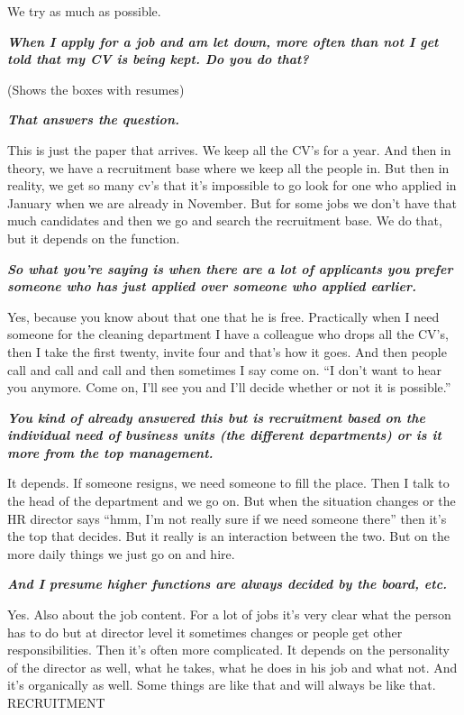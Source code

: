 \documentclass[a4paper,fleqn,11pt,dvips,titlepage]{article}
\newcommand{\question}[1]{\textbf{\textit{#1}}}
\numberwithin{figure}{section}
\numberwithin{equation}{section}
\begin{document}
 We try as much as possible. 

\question{ When I apply for a job and am let down, more often than not I get told that my CV is being kept. Do you do that?}

(Shows the boxes with resumes) 

\question{That answers the question.}

This is just the paper that arrives. We keep all the CV’s for a year. And then in theory, we have a recruitment base where we keep all the people in. But then in reality, we get so many cv’s that it’s impossible to go look for one who applied in January when we are already in November. But for some jobs we don’t have that much candidates and then we go and search the recruitment base. We do that, but it depends on the function. 

\question{So what you’re saying is when there are a lot of applicants you prefer someone who has just applied over someone who applied earlier.}

Yes, because you know about that one that he is free. Practically when I need someone for the cleaning department I have a colleague who drops all the CV’s, then I take the first twenty, invite four and that’s how it goes. And then people call and call and call and then sometimes I say come on. “I don’t want to hear you anymore. Come on, I’ll see you and I’ll decide whether or not it is possible.”

\question{You kind of already answered this but is recruitment based on the individual need of business units (the different departments) or is it more from the top management.}

It depends. If someone resigns, we need someone to fill the place. Then I talk to the head of the department and we go on. But when the situation changes or the HR director says “hmm, I’m not really sure if we need someone there” then it’s the top that decides. But it really is an interaction between the two. But on the more daily things we just go on and hire. 

\question{And I presume higher functions are always decided by the board, etc.}

Yes. Also about the job content. For a lot of jobs it’s very clear what the person has to do but at director level it sometimes changes or people get other responsibilities. Then it’s often more complicated. It depends on the personality of the director as well, what he takes, what he does in his job and what not. And it’s organically as well. Some things are like that and will always be like that.
RECRUITMENT
\end{document}
